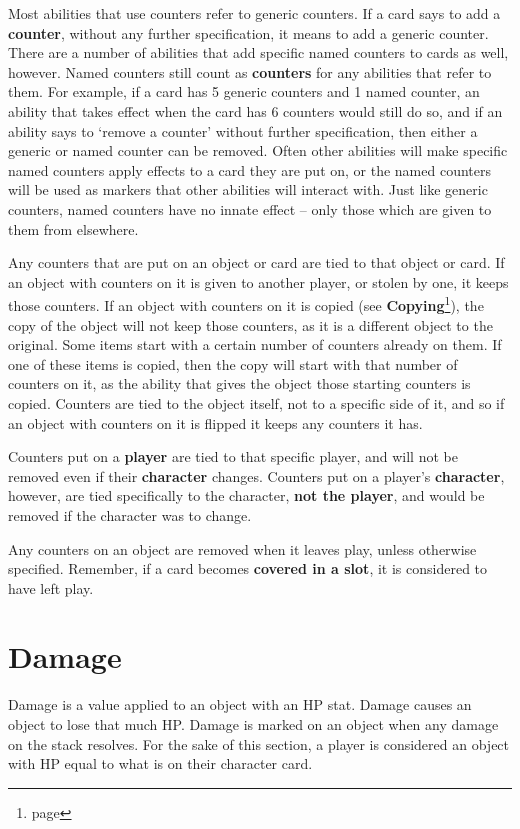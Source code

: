 \documentclass[a4paper, twoside]{report} %
\begin{document}
    Most abilities that use counters refer to generic counters. If a card says to add a \textbf{counter}, without any further specification, it means to add a generic counter. There are a number of abilities that add specific named counters to cards as well, however. Named counters still count as \textbf{counters} for any abilities that refer to them. For example, if a card has 5 generic counters and 1 named counter, an ability that takes effect when the card has 6 counters would still do so, and if an ability says to ‘remove a counter’ without further specification, then either a generic or named counter can be removed. Often other abilities will make specific named counters apply effects to a card they are put on, or the named counters will be used as markers that other abilities will interact with. Just like generic counters, named counters have no innate effect – only those which are given to them from elsewhere.

    Any counters that are put on an object or card are tied to that object or card. If an object with counters on it is given to another player, or stolen by one, it keeps those counters. If an object with counters on it is copied (see \textbf{Copying}\footnote{page \pageref{copying}}), the copy of the object will not keep those counters, as it is a different object to the original. Some items start with a certain number of counters already on them. If one of these items is copied, then the copy will start with that number of counters on it, as the ability that gives the object those starting counters is copied. Counters are tied to the object itself, not to a specific side of it, and so if an object with counters on it is flipped it keeps any counters it has.

    Counters put on a \textbf{player} are tied to that specific player, and will not be removed even if their \textbf{character} changes. Counters put on a player’s \textbf{character}, however, are tied specifically to the character, \textbf{not the player}, and would be removed if the character was to change.

    Any counters on an object are removed when it leaves play, unless otherwise specified. Remember, if a card becomes \textbf{covered in a slot}, it is considered to have left play.
    \section{Damage}
    Damage is a value applied to an object with an HP stat. Damage causes an object to lose that much HP. Damage is marked on an object when any damage on the stack resolves. For the sake of this section, a player is considered an object with HP equal to what is on their character card.
\end{document}
